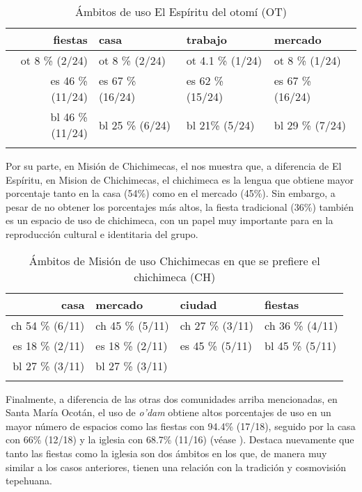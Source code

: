 \documentclass[output=paper]{../langscibook}
\begin{document}
\begin{table}
\caption{\label{tab:guerrero:9} Ámbitos de uso El Espíritu del otomí (OT)}


\begin{tabularx}{\textwidth}{rYYY}
\lsptoprule
{fiestas} & {{casa}} & {{trabajo}} & {{mercado}}\\
\midrule
{{ot} {8} {\%} {(2/24)}} & {{ot} {8} {\%} {(2/24)}} & {{ot} {4.1} {\%} {(1/24)}} & {{ot} {8} {\%} {(1/24)}}\\
{{es} {46} {\%}  {(11/24)}} & {{es} {67} {\%} {(16/24)}} & {{es} {62} {\%} {(15/24)}} & {{es} {67} {\%} {(16/24)}}\\
{{bl} {46} {\%} {(11/24)}} & {{bl} {25} {\%} {(6/24)}} & {{bl} {21\%} {(5/24)}} & {{bl} {29} {\%} {(7/24)}}\\
\lspbottomrule
\end{tabularx}
\end{table}
Por su parte, en Misión de Chichimecas, el  nos muestra que, a diferencia de El Espíritu, en Mision de Chichimecas, el chichimeca es la lengua que obtiene mayor porcentaje tanto en la casa (54\%) como en el mercado (45\%). Sin embargo, a pesar de no obtener los porcentajes más altos, la fiesta tradicional (36\%) también es un espacio de uso de chichimeca, con un papel muy importante para en la reproducción cultural e identitaria del grupo.


\begin{table}
\caption{\label{tab:guerrero:10} Ámbitos de Misión de uso Chichimecas en que se prefiere el chichimeca (CH)}
\begin{tabularx}{\textwidth}{rYYY}
\lsptoprule
{{casa}} & {{mercado}} & {{ciudad}} & {{fiestas}}\\
\midrule
{{ch} {54} {\%} {(6/11)}} & {{ch} {45} {\%} {(5/11)}} & {{ch} {27} {\%} {(3/11)}} & {{ch} {36} {\%} {(4/11)}}\\
{{es} {18} {\%} {(2/11)}} & {{es} {18} {\%} {(2/11)}} & {{es} {45} {\%} {(5/11)}} & {{bl} {45} {\%} {(5/11)}}\\
{{bl} {27} {\%} {(3/11)}} & {{bl} {27} {\%} {(3/11)}} &  & \\
\lspbottomrule
\end{tabularx}
\end{table}

Finalmente, a diferencia de las otras dos comunidades arriba mencionadas, en Santa María Ocotán, el uso de \textit{o'dam} obtiene altos porcentajes de uso en un mayor número de espacios como las fiestas con 94.4\% (17/18), seguido por la casa con 66\% (12/18) y la iglesia con 68.7\% (11/16) (véase ). Destaca nuevamente que tanto las fiestas como la iglesia son dos ámbitos en los que, de manera muy similar a los casos anteriores, tienen una relación con la tradición y cosmovisión tepehuana.
\end{document}

